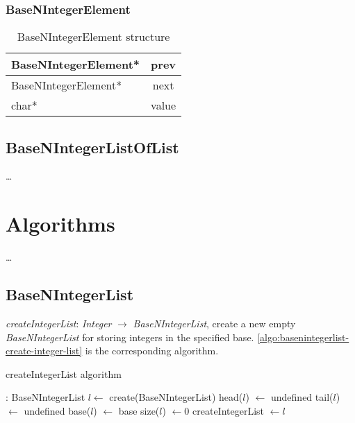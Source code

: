 \documentclass[book, nodocumentinfo]{upmethodology-document}
\begin{document}
\subsection{BaseNIntegerElement}

\begin{table}[h]
    \centering
    \label{tab:basenintegerelement-struct}

    \begin{tabular}{|l|c|}
        \hline
        BaseNIntegerElement* & prev \\
        \hline
        BaseNIntegerElement* & next \\
        \hline
        char* & value \\
        \hline
    \end{tabular}

    \caption{BaseNIntegerElement structure}
\end{table}

\section{BaseNIntegerListOfList}

…

\chapter{Algorithms}

…

\section{BaseNIntegerList}

\emph{createIntegerList}: \emph{Integer} \(\rightarrow\) \emph{BaseNIntegerList},
    create a new empty \emph{BaseNIntegerList} for storing integers in the specified base.
    \ref{algo:basenintegerlist-create-integer-list} is the corresponding algorithm.

\begin{algorithm}[H]
    \label{algo:basenintegerlist-create-integer-list}
    \caption{createIntegerList algorithm}

    \begin{algorithmic}
         : BaseNIntegerList
            \State \(l \leftarrow\) create(BaseNIntegerList)
            \State head(\(l\)) \(\leftarrow\) undefined
            \State tail(\(l\)) \(\leftarrow\) undefined
            \State base(\(l\)) \(\leftarrow\) base
            \State size(\(l\)) \(\leftarrow 0\)
            \State createIntegerList \(\leftarrow l\)
        \EndFunction
    \end{algorithmic}
\end{algorithm}
\end{document}
